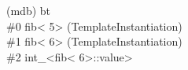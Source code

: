 
\begin{tttenv}
(mdb) bt \\
{\color{color05} \#0 }fib<{\color{color04} 5}> (TemplateInstantiation) \\
{\color{color05} \#1 }fib<{\color{color04} 6}> (TemplateInstantiation) \\
{\color{color05} \#2 }int\_<fib<{\color{color04} 6}>::value>
\end{tttenv}

